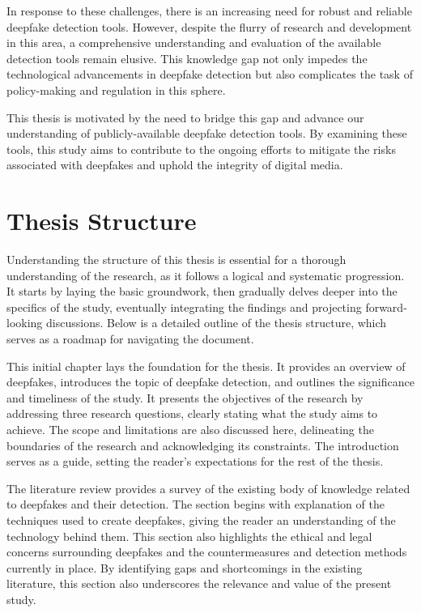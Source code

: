 In response to these challenges, there is an increasing need for robust and reliable
deepfake detection tools. However, despite the flurry of research and development in this
area, a comprehensive understanding and evaluation of the available detection tools remain
elusive. This knowledge gap not only impedes the technological advancements in deepfake
detection but also complicates the task of policy-making and regulation in this sphere.

This thesis is motivated by the need to bridge this gap and advance our understanding of
publicly-available deepfake detection tools. By examining these tools, this study aims to
contribute to the ongoing efforts to mitigate the risks associated with deepfakes and uphold
the integrity of digital media.


\section{Thesis Structure}\label{chapter:structure}
Understanding the structure of this thesis is essential for a thorough understanding of the
research, as it follows a logical and systematic progression. It starts by laying the basic
groundwork, then gradually delves deeper into the specifics of the study, eventually
integrating the findings and projecting forward-looking discussions. Below is a
detailed outline of the thesis structure, which serves as a roadmap for navigating
the document.

This initial chapter lays the foundation for the thesis. It provides an overview of deepfakes,
introduces the topic of deepfake detection, and outlines the significance and timeliness
of the study. It presents the objectives of the research by addressing three research
questions, clearly stating what the study aims to achieve. The scope and limitations are
also discussed here, delineating the boundaries of the research and acknowledging
its constraints. The introduction serves as a guide, setting the reader's expectations
for the rest of the thesis.

The literature review provides a survey of the existing body of knowledge
related to deepfakes and their detection. The section begins with explanation of the
techniques used to create deepfakes, giving the reader an understanding of the
technology behind them. This section also highlights the ethical and legal concerns
surrounding deepfakes and the countermeasures and detection methods currently in place.
By identifying gaps and shortcomings in the existing literature, this section also
underscores the relevance and value of the present study.

